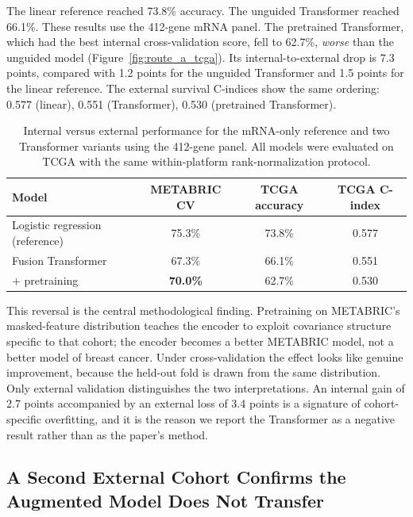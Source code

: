 \documentclass[11pt,a4paper]{article}
\begin{document}
The linear reference reached 73.8\% accuracy. The unguided Transformer reached 66.1\%.
These results use the 412-gene mRNA panel. The pretrained Transformer, which had the best internal
cross-validation score, fell to 62.7\%, \emph{worse} than the unguided model
(Figure~\ref{fig:route_a_tcga}). Its internal-to-external drop is 7.3 points, compared with 1.2
points for the unguided Transformer and 1.5 points for the linear reference. The external survival
C-indices show the same ordering: 0.577 (linear), 0.551 (Transformer), 0.530 (pretrained
Transformer).

\begin{table}[H]
\centering
\caption{Internal versus external performance for the mRNA-only reference and two Transformer
variants using the 412-gene panel. All models were evaluated on TCGA with the same
within-platform rank-normalization protocol.}
\label{tab:route_a}
\begin{tabular}{lccc}
\toprule
\textbf{Model} & \textbf{METABRIC CV} & \textbf{TCGA accuracy} & \textbf{TCGA C-index} \\
\midrule
Logistic regression (reference) & 75.3\% & 73.8\% & 0.577 \\
Fusion Transformer & 67.3\% & 66.1\% & 0.551 \\
\quad + pretraining & \textbf{70.0\%} & 62.7\% & 0.530 \\
\bottomrule
\end{tabular}
\end{table}

This reversal is the central methodological finding. Pretraining on METABRIC's masked-feature
distribution teaches the encoder to exploit covariance structure specific to that cohort;
the encoder becomes a better METABRIC model, not a better model of breast cancer. Under
cross-validation the effect looks like genuine improvement, because the held-out fold is drawn
from the same distribution. Only external validation distinguishes the two interpretations. An
internal gain of 2.7 points accompanied by an external loss of 3.4 points is a signature of
cohort-specific overfitting, and it is the reason we report the Transformer as a negative
result rather than as the paper's method.

\subsection{A Second External Cohort Confirms the Augmented Model Does Not Transfer}
\label{sec:route_a_gse}
\end{document}
